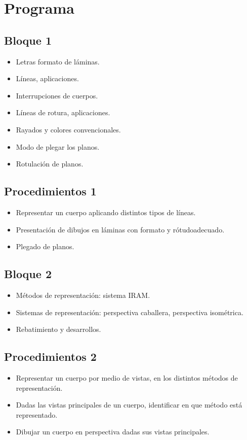 \documentclass[../main]{subfiles}
\begin{document}
\pagestyle{empty}
\section{Programa}
\subsection{Bloque 1}
\begin{itemize}
    \item Letras formato de láminas.
    \item Líneas, aplicaciones.
    \item Interrupciones de cuerpos.
    \item Líneas de rotura, aplicaciones.
    \item Rayados y colores convencionales.
    \item Modo de plegar los planos.
    \item Rotulación de planos.
\end{itemize}
\subsection{Procedimientos 1}
\begin{itemize}
    \item Representar un cuerpo aplicando distintos tipos de líneas.
    \item Presentación de dibujos en láminas con formato y rótudoadecuado.
    \item Plegado de planos.
\end{itemize}
\subsection{Bloque 2}
\begin{itemize}
    \item Métodos de representación: sistema IRAM.
    \item Sistemas de representación: perspectiva caballera, perspectiva isométrica.
    \item Rebatimiento y desarrollos.
\end{itemize}
\subsection{Procedimientos 2}
\begin{itemize}
    \item Representar un cuerpo por medio de vistas, en los distintos métodos de representación.
    \item Dadas las vistas principales de un cuerpo, identificar en que método está representado.
    \item Dibujar un cuerpo en perspectiva dadas sus vistas principales.
\end{itemize}
\end{document}
